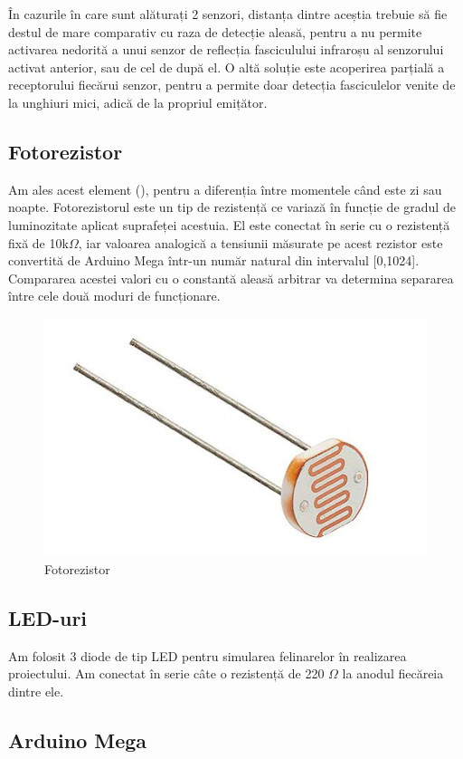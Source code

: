 În cazurile în care sunt alăturați 2 senzori, distanța dintre aceștia trebuie să fie destul de mare comparativ cu raza de detecție aleasă, pentru a nu permite activarea nedorită a unui senzor de reflecția fasciculului infraroșu al senzorului activat anterior, sau de cel de după el. O altă soluție este acoperirea parțială  a receptorului fiecărui senzor, pentru a permite doar detecția fasciculelor venite de la unghiuri mici, adică de la propriul emițător. 
\subsection{Fotorezistor}

Am ales acest element (), pentru a diferenția între momentele când este zi sau noapte. Fotorezistorul este un tip de rezistență ce variază în funcție de gradul de luminozitate aplicat suprafeței acestuia. El este conectat în serie cu o rezistență fixă de 10k$\Omega$, iar valoarea analogică a tensiunii măsurate pe acest rezistor este convertită de Arduino Mega într-un număr natural din intervalul [0,1024]. Compararea acestei valori cu o constantă aleasă arbitrar va determina separarea între cele două moduri de funcționare.

\begin{figure}[!ht]
    \begin{center}
    \includegraphics[width=0.3\linewidth,keepaspectratio]{pics/LDR.jpg}
    \end{center}
    \caption{Fotorezistor}
    \label{fig:ldr}
\end{figure}



\subsection{LED-uri}

Am folosit 3 diode de tip LED pentru simularea felinarelor în realizarea proiectului. Am conectat în serie câte o rezistență de 220 $\Omega$ la anodul fiecăreia dintre ele. 

\subsection{Arduino Mega} \label{mega}

